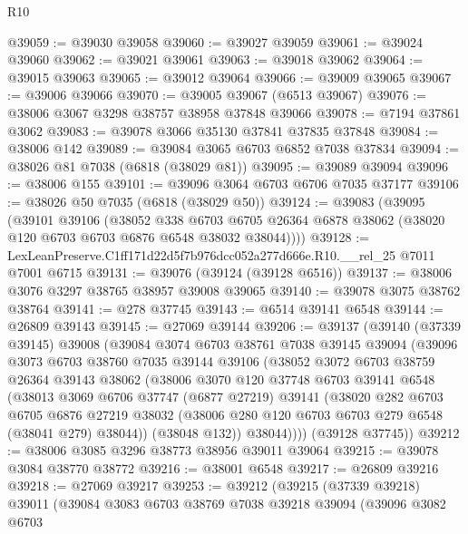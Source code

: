 \begin{lexlean}{R10}
\begin{coremodule}
@39059 := @39030 @39058
@39060 := @39027 @39059
@39061 := @39024 @39060
@39062 := @39021 @39061
@39063 := @39018 @39062
@39064 := @39015 @39063
@39065 := @39012 @39064
@39066 := @39009 @39065
@39067 := @39006 @39066
@39070 := @39005 @39067 (@6513 @39067)
@39076 := @38006 @3067 @3298 @38757 @38958 @37848 @39066
@39078 := @7194 @37861 @3062
@39083 := @39078 @3066 @35130 @37841 @37835 @37848
@39084 := @38006 @142
@39089 := @39084 @3065 @6703 @6852 @7038 @37834
@39094 := @38026 @81 @7038 (@6818 (@38029 @81))
@39095 := @39089 @39094
@39096 := @38006 @155
@39101 := @39096 @3064 @6703 @6706 @7035 @37177
@39106 := @38026 @50 @7035 (@6818 (@38029 @50))
@39124 := @39083
    (@39095
      (@39101
        @39106
        (@38052
          @338
          @6703
          @6705
          @26364
          @6878
          @38062
          (@38020 @120 @6703 @6703 @6876 @6548 @38032 @38044))))
@39128 := LexLeanPreserve.C1ff171d22d5f7b976dcc052a277d666e.R10.__rel_25 @7011 @7001 @6715
@39131 := @39076 (@39124 (@39128 @6516))
@39137 := @38006 @3076 @3297 @38765 @38957 @39008 @39065
@39140 := @39078 @3075 @38762 @38764
@39141 := @278 @37745
@39143 := @6514 @39141 @6548
@39144 := @26809 @39143
@39145 := @27069 @39144
@39206 := @39137
    (@39140
      (@37339 @39145)
      @39008
      (@39084
        @3074
        @6703
        @38761
        @7038
        @39145
        @39094
        (@39096
          @3073
          @6703
          @38760
          @7035
          @39144
          @39106
          (@38052
            @3072
            @6703
            @38759
            @26364
            @39143
            @38062
            (@38006
              @3070
              @120
              @37748
              @6703
              @39141
              @6548
              (@38013
                @3069
                @6706
                @37747
                (@6877 @27219)
                @39141
                (@38020
                  @282
                  @6703
                  @6705
                  @6876
                  @27219
                  @38032
                  (@38006 @280 @120 @6703 @6703 @279 @6548 (@38041 @279) @38044))
                (@38048 @132))
              @38044))))
      (@39128 @37745))
@39212 := @38006 @3085 @3296 @38773 @38956 @39011 @39064
@39215 := @39078 @3084 @38770 @38772
@39216 := @38001 @6548
@39217 := @26809 @39216
@39218 := @27069 @39217
@39253 := @39212
    (@39215
      (@37339 @39218)
      @39011
      (@39084
        @3083
        @6703
        @38769
        @7038
        @39218
        @39094
        (@39096
          @3082
          @6703

\end{coremodule}
\end{lexlean}
